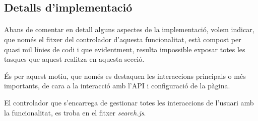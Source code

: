 \subsection{Detalls d'implementació}

    \paragraph{}
    Abans de comentar en detall alguns aspectes de la implementació, volem indicar, que només el fitxer del controlador d'aquesta funcionalitat, està compost per quasi mil línies de codi i que evidentment, resulta impossible exposar totes les tasques que aquest realitza en aquesta secció.

    És per aquest motiu, que només es destaquen les interaccions principals o més importants, de cara a la interacció amb l'API i configuració de la pàgina.

    El controlador que s'encarrega de gestionar totes les interaccions de l'usuari amb la funcionalitat, es troba en el fitxer \emph{search.js}.

    
    
    
    
